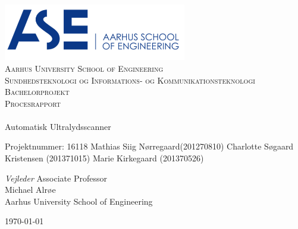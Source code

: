 \begin{titlingpage}
\begin{center}

~ \\[3cm]

\includegraphics[width=0.6\textwidth]{figurer/ASE}~\\[1cm]

\textsc{\LARGE Aarhus University School of Engineering}\\[1.5cm]

\textsc{\Large Sundhedsteknologi og Informations- og Kommunikationsteknologi}\\
\textsc{\Large Bachelorprojekt}\\[0.5cm]
\textsc{\Large Procesrapport} \\[1cm]

\noindent\makebox[\linewidth]{\rule{\textwidth}{0.4pt}}\\
[0.5cm]{\Huge Automatisk Ultralydsscanner}
\noindent\makebox[\linewidth]{\rule{\textwidth}{0.4pt}}

\end{center}
Projektnummer: 16118 \newline
Mathias Siig Nørregaard(201270810) \newline
Charlotte Søgaard Kristensen (201371015) \newline		 
Marie Kirkegaard (201370526) \newline 


\textit{Vejleder} \newline
Associate Professor\\
Michael Alrøe\\
Aarhus University School of Engineering


\vfill

\begin{center}
{\large \today}
\end{center}

\end{titlingpage}